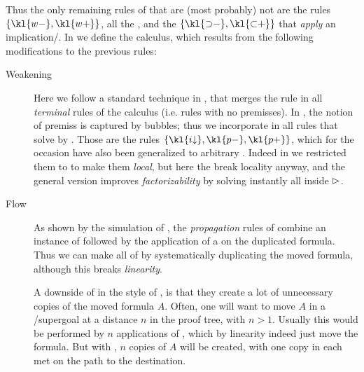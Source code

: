 \begin{scope}
Thus the only remaining rules of  that are (most probably) not
 are the  rules $\{\kl{w{-}},\kl{w{+}}\}$, all the
, and the  $\{\kl{{\limp}{-}},
\kl{{\lsub}{+}}\}$ that \emph{apply} an implication/.
In  we define the  calculus, which results
from the following modifications to the previous rules:
\begin{description}
  \item[Weakening]
    Here we follow a standard technique in , that merges
    the  rule in all \emph{terminal} rules of the calculus (i.e.
    rules with no premisses). In , the notion of premiss is
    captured by  bubbles; thus we incorporate  in all
    rules that solve  by  .
    Those are the rules $\{\kl{i{\da}},\kl{p{-}},\kl{p{+}}\}$, which for the
    occasion have also been generalized to arbitrary . Indeed in
     we restricted them to   to make
    them \emph{local}, but here the  break locality anyway, and
    the general version improves \emph{factorizability} by solving instantly all
     inside $\mathbin{\rhd}$.

  \item[Flow]
    As shown by the simulation of , the
    \emph{propagation} rules of  combine an instance of
    \emph{} followed by the application of a 
    on the duplicated formula. Thus we can make all  of
      by systematically duplicating the moved
    formula, although this breaks \emph{linearity}.

    A downside of  in the style of , is that they
    create a lot of unnecessary copies of the moved formula $A$. Often, one will
    want to move $A$ in a /supergoal at a distance $n$ in the proof tree,
    with $n > 1$. Usually this would be performed by $n$ applications of
    , which by linearity indeed just move the formula. But with
    , $n$ copies of $A$ will be created, with one copy in each
     met on the path to the destination.


\end{description}
\end{scope}
